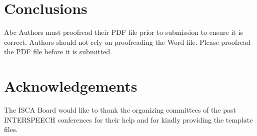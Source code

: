 \documentclass[a4paper]{article}
\begin{document}
  \section{Conclusions}

     Abc Authors must proofread their PDF file prior to submission to ensure it is correct. 
     Authors should not rely on proofreading the Word file. 
     Please proofread the PDF file before it is submitted.


  \section{Acknowledgements}
  
    The ISCA Board would like to thank the organizing committees of the past INTERSPEECH conferences for their help and for kindly providing the template files.


  \newpage
  \eightpt
  

  

\end{document}

